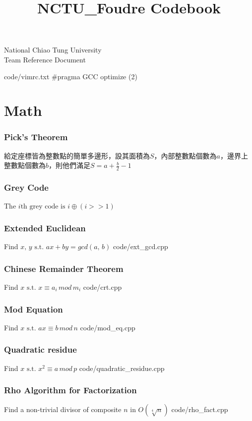 \documentclass [landscape,8pt,a4paper,twocolumn]{article}
\title {NCTU\_Foudre Codebook}
\begin{document}
\thispagestyle{fancy}
{ \Huge National Chiao Tung University \\
Team Reference Document}
\tableofcontents

 {code/vimrc.txt}
\#pragma GCC optimize (2)

\newpage
\part{Math}

\section{Pick's Theorem}
給定座標皆為整數點的簡單多邊形，設其面積為$ S $，內部整數點個數為$ a $，邊界上整數點個數為$ b $，則他們滿足$ S=a+\frac{b}{2}-1 $

\section{Grey Code}
The $ i \text{th grey code is } i \oplus (i>>1) $

\section{Extended Euclidean}
Find $ x, \, y \text{ s.t. } ax+by=gcd(a, \, b) $
 {code/ext_gcd.cpp}

\section{Chinese Remainder Theorem}
Find $ x \text{ s.t. } x \equiv a_i \, mod \, m_i $
 {code/crt.cpp}

\section{Mod Equation}
Find $ x \text{ s.t. } ax \equiv b \, mod \, n $
 {code/mod_eq.cpp}

\section{Quadratic residue}
Find $ x \text{ s.t. } x^2 \equiv a \, mod \, p $
{code/quadratic_residue.cpp}

\section{Rho Algorithm for Factorization}
Find a non-trivial divisor of composite $ n $ in $ O(\sqrt[4]{n}) $
 {code/rho_fact.cpp}
\end{document}
